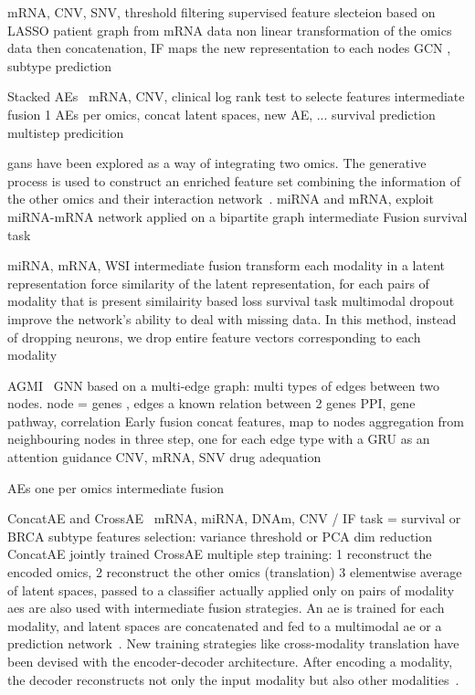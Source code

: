 \documentclass[../main.tex]{subfiles}
\begin{document}
		\cite{Yin2022} mRNA, CNV, SNV,
		threshold filtering
		supervised feature slecteion based on LASSO
		patient graph from mRNA data
		non linear transformation of the omics data then concatenation, IF
		maps the new representation to each nodes
		GCN , subtype prediction

		Stacked AEs~\cite{Wu2022StackedAB}
		mRNA, CNV, clinical
		log rank test to selecte features
		intermediate fusion
		1 AEs per omics, concat latent spaces, new AE, ...
		survival prediction
		multistep predicition

		\Glspl{gan} have been explored as a way of integrating two omics.
		The generative process is used to construct an enriched feature set combining the information of the other omics and their interaction network~\cite{omicsGAN}.
		miRNA and mRNA, exploit miRNA-mRNA network
		applied on a bipartite graph intermediate Fusion
		survival task

		\cite{Cheerla2019}
		miRNA, mRNA, WSI
		intermediate fusion transform each modality in a latent representation
		force similarity of the latent representation, for each pairs of modality that is present similairity based loss
		survival task
		multimodal dropout improve the network’s ability to deal with missing data. In this method, instead of dropping neurons, we drop entire feature vectors corresponding to each modality

		AGMI~\cite{AGMI} GNN based on a multi-edge graph: multi types of edges between two nodes. node = genes , edges a known relation between 2 genes PPI, gene pathway, correlation
		Early fusion concat features, map to nodes
		aggregation from neighbouring nodes in three step, one for each edge type with a GRU as an attention guidance
		CNV, mRNA, SNV drug adequation

		\cite{Ma2019} AEs one per omics intermediate fusion

		ConcatAE and CrossAE~\cite{CrossAE} mRNA, miRNA, DNAm, CNV / IF
		task = survival or BRCA subtype
		features selection: variance threshold or PCA dim reduction
		ConcatAE jointly trained
		CrossAE multiple step training: 1 reconstruct the encoded omics, 2 reconstruct the other omics (translation) 3 elementwise average of latent spaces, passed to a classifier
		actually applied only on pairs of modality
		\glspl{ae} are also used with intermediate fusion strategies.
		An \gls{ae} is trained for each modality, and latent spaces are concatenated and fed to a multimodal \gls{ae} or a prediction network~\cite{CrossAE, HierachicalAE}.
		New training strategies like cross-modality translation have been devised with the encoder-decoder architecture.
		After encoding a modality, the decoder reconstructs not only the input modality but also other modalities~\cite{CrossAE}.
\end{document}
